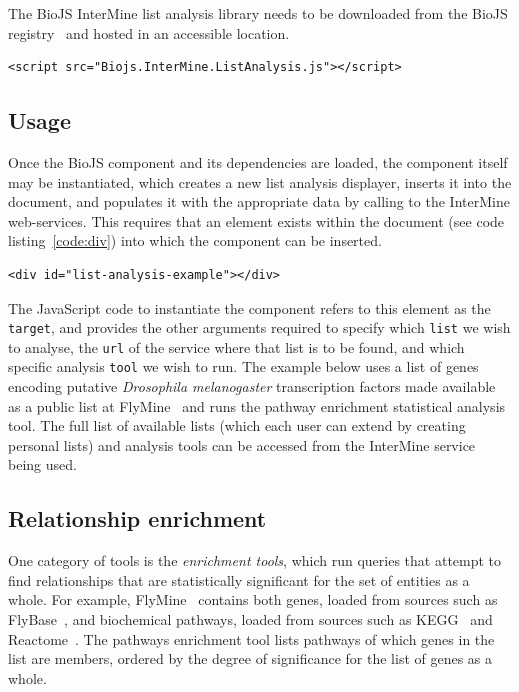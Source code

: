 \documentclass[10pt,a4paper,twocolumn]{article}
\begin{document}
The BioJS InterMine list analysis library needs to be downloaded from the BioJS
registry~\cite{site:biojs-registry} and hosted in an accessible location.

\begin{lstlisting}[caption={Loading the list analysis tools library.}, label={code:loading}]
<script src="Biojs.InterMine.ListAnalysis.js"></script>
\end{lstlisting}

\subsection*{Usage}

Once the BioJS component and its dependencies are loaded, the component itself
may be instantiated, which creates a new list analysis displayer, inserts it
into the document, and populates it with the appropriate data by calling to the
InterMine web-services. This requires that an element exists within the document
(see code listing~\ref{code:div}) into which the component can be inserted.

\begin{lstlisting}[caption={The target document element},label={code:div}]
<div id="list-analysis-example"></div>
\end{lstlisting}

The JavaScript code to instantiate the component refers to this element as the
\texttt{target}, and provides the other arguments required to specify which
\texttt{list} we wish to analyse, the \texttt{url} of the service where that
list is to be found, and which specific analysis \texttt{tool} we wish to run.
The example below uses a list of genes encoding putative \emph{Drosophila
melanogaster} transcription factors made available as a public list at
FlyMine~\cite{flymine} and runs the pathway enrichment statistical analysis
tool. The full list of available lists (which each user can extend by creating
personal lists) and analysis tools can be accessed from the InterMine service
being used.

\subsection*{Relationship enrichment}

One category of tools is the \emph{enrichment tools}, which run queries that
attempt to find relationships that are statistically significant for the set of
entities as a whole.  For example, FlyMine~\cite{flymine} contains both genes,
loaded from sources such as FlyBase~\cite{flybase}, and biochemical pathways,
loaded from sources such as KEGG~\cite{kegg} and Reactome~\cite{reactome}.  The
pathways enrichment tool lists pathways of which genes in the list are members,
ordered by the degree of significance for the list of genes as a whole.
\end{document}

